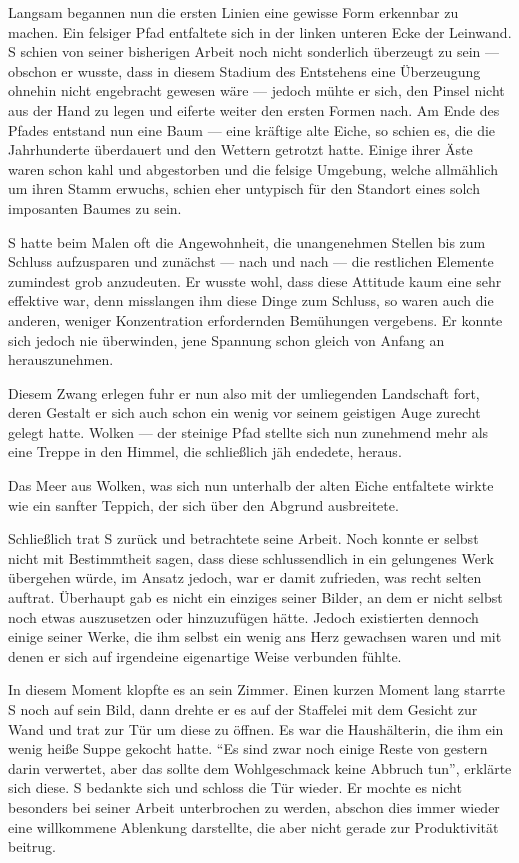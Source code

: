 \documentclass{article}
\begin{document}
Langsam begannen nun die ersten Linien eine gewisse Form erkennbar zu machen. Ein felsiger Pfad entfaltete sich in der linken unteren Ecke der Leinwand.
S schien von seiner bisherigen Arbeit noch nicht sonderlich überzeugt zu sein --- obschon er wusste, dass in diesem Stadium des Entstehens eine Überzeugung ohnehin nicht engebracht gewesen wäre --- jedoch mühte er sich, den Pinsel nicht aus der Hand zu legen und eiferte weiter den ersten Formen nach.
Am Ende des Pfades entstand nun eine Baum --- eine kräftige alte Eiche, so schien es, die die Jahrhunderte überdauert und den Wettern getrotzt hatte. Einige ihrer Äste waren schon kahl und abgestorben und die felsige Umgebung, welche allmählich um ihren Stamm erwuchs, schien eher untypisch für den Standort eines solch imposanten Baumes zu sein.

S hatte beim Malen oft die Angewohnheit, die unangenehmen Stellen bis zum Schluss aufzusparen und zunächst --- nach und nach --- die restlichen Elemente zumindest grob anzudeuten. Er wusste wohl, dass diese Attitude kaum eine sehr effektive war, denn misslangen ihm diese Dinge zum Schluss, so waren auch die anderen, weniger Konzentration erfordernden Bemühungen vergebens.
Er konnte sich jedoch nie überwinden, jene Spannung schon gleich von Anfang an herauszunehmen.

Diesem Zwang erlegen fuhr er nun also mit der umliegenden Landschaft fort, deren Gestalt er sich auch schon ein wenig vor seinem geistigen Auge zurecht gelegt hatte. Wolken --- der steinige Pfad stellte sich nun zunehmend mehr als eine Treppe in den Himmel, die schließlich jäh endedete, heraus.

Das Meer aus Wolken, was sich nun unterhalb der alten Eiche entfaltete wirkte wie ein sanfter Teppich, der sich über den Abgrund ausbreitete.

Schließlich trat S zurück und betrachtete seine Arbeit. Noch konnte er selbst nicht mit Bestimmtheit sagen, dass diese schlussendlich in ein gelungenes Werk übergehen würde, im Ansatz jedoch, war er damit zufrieden, was recht selten auftrat. Überhaupt gab es nicht ein einziges seiner Bilder, an dem er nicht selbst noch etwas auszusetzen oder hinzuzufügen hätte.
Jedoch existierten dennoch einige seiner Werke, die ihm selbst ein wenig ans Herz gewachsen waren und mit denen er sich auf irgendeine eigenartige Weise verbunden fühlte.

In diesem Moment klopfte es an sein Zimmer. Einen kurzen Moment lang starrte S noch auf sein Bild, dann drehte er es auf der Staffelei mit dem Gesicht zur Wand und trat zur Tür um diese zu öffnen. Es war die Haushälterin, die ihm ein wenig heiße Suppe gekocht hatte. ``Es sind zwar noch einige Reste von gestern darin verwertet, aber das sollte dem Wohlgeschmack keine Abbruch tun'', erklärte sich diese. S bedankte sich und schloss die Tür wieder. Er mochte es nicht besonders bei seiner Arbeit unterbrochen zu werden, abschon dies immer wieder eine willkommene Ablenkung darstellte, die aber nicht gerade zur Produktivität beitrug.
\end{document}
